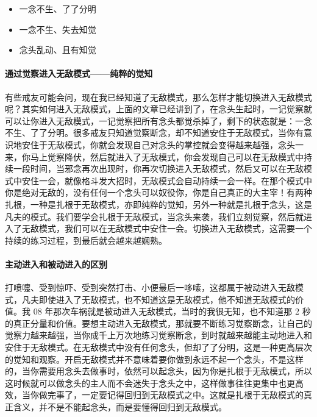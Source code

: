 \begin{multicols}{3}
    \begin{itemize}
        \item 一念不生、了了分明
        \item 一念不生、失去知觉
        \item 念头乱动、且有知觉
    \end{itemize}
\end{multicols}

\paragraph{通过觉察进入无敌模式——纯粹的觉知}

有些戒友可能会问，现在我已经知道了无敌模式，那么怎样才能切换进入无敌模式呢？其实如何进入无敌模式，上面的文章已经讲到了，在念头生起时，一记觉察就可以让你进入无敌模式，一记觉察把所有念头都觉杀掉了，剩下的状态就是：一念不生、了了分明。很多戒友只知道觉察断念，却不知道安住于无敌模式，当你有意识地安住于无敌模式，你就会发现自己对念头的掌控就会变得越来越强，念头一来，你马上觉察降伏，然后就进入了无敌模式，你会发现自己可以在无敌模式中持续一段时间，当邪念再次出现时，你再次切换进入无敌模式，然后又可以在无敌模式中安住一会，就像格斗发大招时，无敌模式会自动持续一会一样。在那个模式中你是绝对无敌的，没有任何一个念头可以奴役你，你是自己真正的大主宰！有两种扎根，一种是扎根于无敌模式，亦即纯粹的觉知，另外一种就是扎根于念头，这是凡夫的模式。我们要学会扎根于无敌模式，当念头来袭，我们立刻觉察，然后就进入了无敌模式，我们可以在无敌模式中安住一会。切换进入无敌模式，这需要一个持续的练习过程，到最后就会越来越娴熟。

\paragraph{主动进入和被动进入的区别}

打喷嚏、受到惊吓、受到突然打击、小便最后一哆嗦，这都属于被动进入无敌模式，凡夫即使进入了无敌模式，也不知道这是无敌模式，他不知道无敌模式的价值。我 08 年那次车祸就是被动进入无敌模式，当时的我很无知，也不知道那 2 秒的真正分量和价值。要想主动进入无敌模式，那就要不断练习觉察断念，让自己的觉察力越来越强，当你成千上万次地练习觉察断念，到时就越来越能主动地进入和安住于无敌模式。在无敌模式中没有任何念头，但却了了分明，这是一种更高层次的觉知和观察。开启无敌模式并不意味着要你做到永远不起一个念头，不是这样的，当你需要用念头去做事时，依然可以起念头，因为你是扎根于无敌模式，所以这时候就可以做念头的主人而不会迷失于念头之中，这样做事往往更集中也更高效，当你做完事了，一定要记得回归到无敌模式之中。这就是扎根于无敌模式的真正含义，并不是不能起念头，而是要懂得回归到无敌模式。

